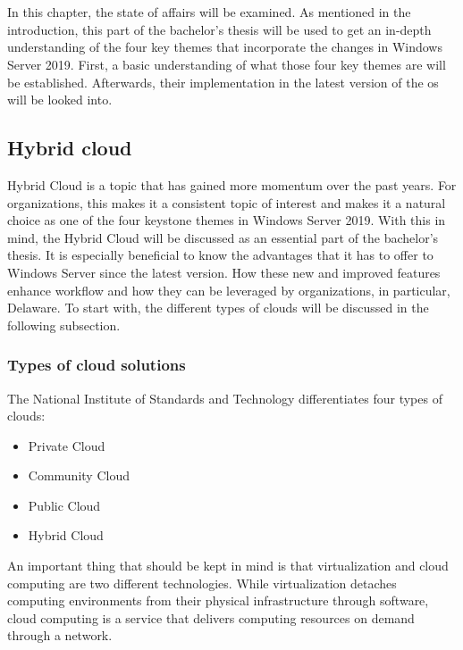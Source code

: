 \chapter{}
\label{ch:stand-van-zaken}
In this chapter, the state of affairs will be examined. As mentioned in the introduction, this part of the bachelor's thesis will be used to get an in-depth understanding of the four key themes that incorporate the changes in Windows Server 2019. First, a basic understanding of what those four key themes are will be established. Afterwards, their implementation in the latest version of the \acrshort{os} will be looked into.

\section{Hybrid cloud}
Hybrid Cloud is a topic that has gained more momentum over the past years. For organizations, this makes it a consistent topic of interest and makes it a natural choice as one of the four keystone themes in Windows Server 2019.\autocite{MWST2018} With this in mind, the Hybrid Cloud will be discussed as an essential part of the bachelor's thesis. It is especially beneficial to know the advantages that it has to offer to Windows Server since the latest version. How these new and improved features enhance workflow and how they can be leveraged by organizations, in particular, Delaware. To start with, the different types of clouds will be discussed in the following subsection.

\subsection{Types of cloud solutions}
The National Institute of Standards and Technology differentiates four types of clouds\autocite{Mell2011}:
\begin{itemize}
	\item Private Cloud
	\item Community Cloud
	\item Public Cloud
	\item Hybrid Cloud
\end{itemize}	
An important thing that should be kept in mind is that virtualization and cloud computing are two different technologies. While virtualization detaches computing environments from their physical infrastructure through software, cloud computing is a service that delivers computing resources on demand through a network.\autocite{Naeem2016}

